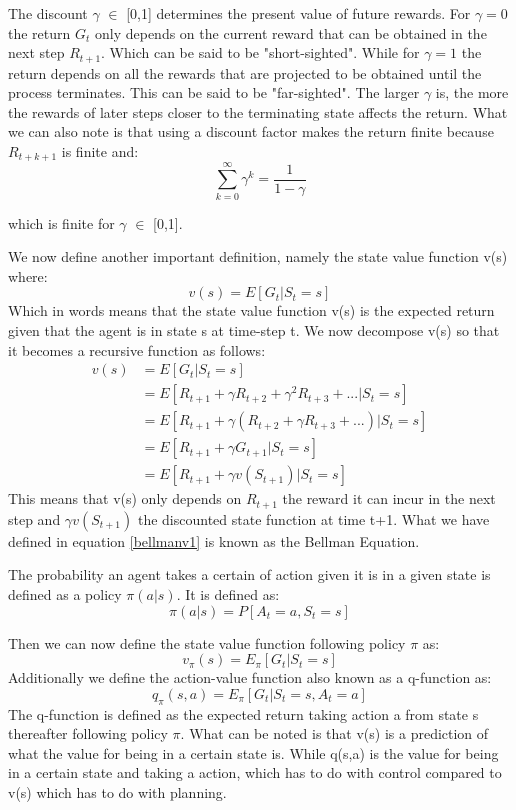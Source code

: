 The discount $\gamma$ $\in$ [0,1] determines the present value of future rewards. For $\gamma=0$ the return $G_t$ only depends on the current reward that can be obtained in the next step $R_{t+1}$. Which can be said to be "short-sighted". While for $\gamma=1$ the return depends on all the rewards that are projected to be obtained until the process terminates. This can be said to be "far-sighted". The larger $\gamma$ is, the more the rewards of later steps closer to the terminating state affects the return.\cite{sutton_barto}
What we can also note is that using a discount factor makes the return finite because $R_{t+k+1}$ is finite and:
\[ \sum_{k=0}^{\infty}\gamma^{k}=\frac{1}{1-\gamma}\]
\centerline{which is finite for $\gamma$ $\in$ [0,1].}

We now define another important definition, namely the state value function v(s) where:
\[v(s) = E[G_t | S_t = s]\]
Which in words means that the state value function v(s) is the expected return given that the agent is in state s at time-step t.
We now decompose v(s) so that it becomes a recursive function as follows:
\begin{align}
	v(s) &= E[G_t | S_t = s]\\
	&= E[R_{t+1} + \gamma R_{t+2} + \gamma^{2} R_{t+3} + ...|S_t = s]\\
	&= E[R_{t+1} + \gamma (R_{t+2} + \gamma R_{t+3} + ...)|S_t = s]\\
	&= E[R_{t+1} + \gamma G_{t+1}|S_t = s]\\
	&= E[R_{t+1} + \gamma v(S_{t+1})|S_t = s]
	\label{bellmanv1}
\end{align}
This means that v(s) only depends on $R_{t+1}$ the reward it can incur in the next step and $\gamma v(S_{t+1})$ the discounted state function at time t+1.
What we have defined in equation \ref{bellmanv1} is known as the Bellman Equation.\cite{sutton_barto}

The probability an agent takes a certain of action given it is in a given state is defined as a policy $\pi(a|s)$. It is defined as:
\[\pi(a|s) = P[A_t = a, S_t = s]\]

Then we can now define the state value function following policy $\pi$ as:
\[v_{\pi}(s) = E_{\pi}[G_t | S_t = s]\]
Additionally we define the action-value function also known as a q-function as:
\[q_{\pi}(s,a) = E_{\pi}[G_t | S_t = s,A_t = a]\]
The q-function is defined as the expected return taking action a from state s thereafter following policy $\pi$. What can be noted is that v(s) is a prediction of what the value for being in a certain state is. While q(s,a) is the value for being in a certain state and taking a action, which has to do with control compared to v(s) which has to do with planning. 


